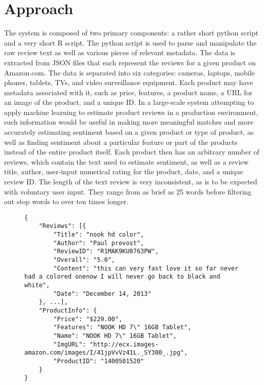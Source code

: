 \section{Approach}
The system is composed of two primary components: a rather short python script and a very short R script. The python script is used to parse and manipulate the raw review text as well as various pieces of relevant metadata. The data is extracted from JSON files that each represent the reviews for a given product on Amazon.com. The data is separated into six categories: cameras, laptops, mobile phones, tablets, TVs, and video surveillance equipment. Each product may have metadata associated with it, such as price, features, a product name, a URL for an image of the product, and a unique ID. In a large-scale system attempting to apply machine learning to estimate product reviews in a production environment, such information would be useful in making more meaningful matches and more accurately estimating sentiment based on a given product or type of product, as well as finding sentiment about a particular feature or part of the products instead of the entire product itself. Each product then has an arbitrary number of reviews, which contain the text used to estimate sentiment, as well as a review title, author, user-input numerical rating for the product, date, and a unique review ID. The length of the text review is very inconsistent, as is to be expected with voluntary user input. They range from as brief as 25 words before filtering out stop words to over ten times longer.

\begin{figure}
\begin{lstlisting}
{
    "Reviews": [{
        "Title": "nook hd color",
        "Author": "Paul prevost",
        "ReviewID": "R1MAK9KU0763PW",
        "Overall": "5.0",
        "Content": "this can very fast love it so far never had a colored onenow I will never go back to black and white",
        "Date": "December 14, 2013"
    }, ...],
    "ProductInfo": {
        "Price": "$229.00",
        "Features": "NOOK HD 7\" 16GB Tablet",
        "Name": "NOOK HD 7\" 16GB Tablet",
        "ImgURL": "http://ecx.images-amazon.com/images/I/41jpVvVz41L._SY300_.jpg",
        "ProductID": "1400501520"
    }
}
\end{lstlisting}
\caption{}
\end{figure}


